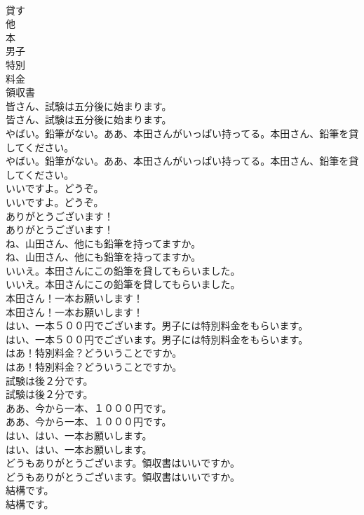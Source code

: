 \documentclass[8pt]{extreport}
\begin{document}
\begin{CJK}{UTF8}{min}
\\	貸す
\\	他
\\	本
\\	男子
\\	特別
\\	料金
\\	領収書
\\	皆さん、試験は五分後に始まります。	
\\	皆さん、試験は五分後に始まります。 
\\	やばい。鉛筆がない。ああ、本田さんがいっぱい持ってる。本田さん、鉛筆を貸してください。	
\\	やばい。鉛筆がない。ああ、本田さんがいっぱい持ってる。本田さん、鉛筆を貸してください。 
\\	いいですよ。どうぞ。	
\\	いいですよ。どうぞ。 
\\	ありがとうございます！	
\\	ありがとうございます！ 
\\	ね、山田さん、他にも鉛筆を持ってますか。	
\\	ね、山田さん、他にも鉛筆を持ってますか。 
\\	いいえ。本田さんにこの鉛筆を貸してもらいました。	
\\	いいえ。本田さんにこの鉛筆を貸してもらいました。 
\\	本田さん！一本お願いします！	
\\	本田さん！一本お願いします！ 
\\	はい、一本５００円でございます。男子には特別料金をもらいます。	
\\	はい、一本５００円でございます。男子には特別料金をもらいます。 
\\	はあ！特別料金？どういうことですか。	
\\	はあ！特別料金？どういうことですか。 
\\	試験は後２分です。	
\\	試験は後２分です。 
\\	ああ、今から一本、１０００円です。	
\\	ああ、今から一本、１０００円です。 
\\	はい、はい、一本お願いします。	
\\	はい、はい、一本お願いします。 
\\	どうもありがとうございます。領収書はいいですか。	
\\	どうもありがとうございます。領収書はいいですか。 
\\	結構です。	
\\	結構です。 

\end{CJK}
\end{document}

